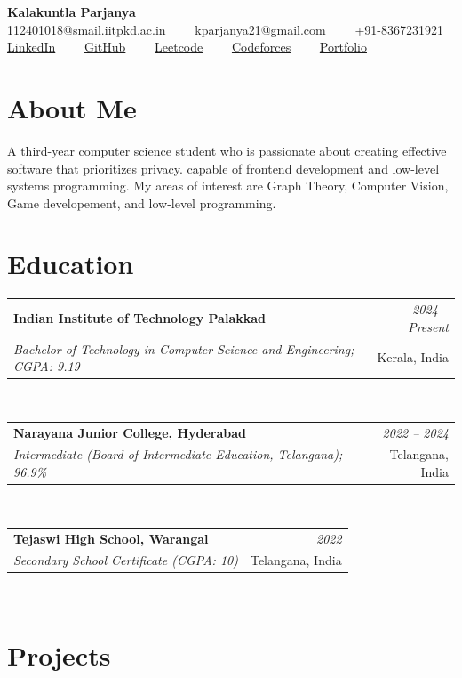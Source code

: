 \documentclass[a4paper,10pt]{article}
\makeatletter
\newcommand{\resumeSubheading}[4]{
\vspace{1.2mm}
    \begin{tabular*}{1.0\textwidth}[t]{l@{\extracolsep{\fill}}r}
        \textbf{#1} & \textit{\small{#4}} \\
        \textit{\small{#3}} &  \small{#2}\\
    \end{tabular*}\\[-1.5mm]
}
\newcommand{\resumeSubHeadingListStart}{}
\newcommand{\resumeSubHeadingListEnd}{\vspace{0.5mm}}
\makeatother
\begin{document}
\selectfont

\begin{center}
    {\Huge \textbf{Kalakuntla Parjanya}} \\[1.5mm]
    \small
    \href{mailto:112401018@smail.iitpkd.ac.in}{112401018@smail.iitpkd.ac.in} \ \ \textbullet\ \ 
    \href{mailto:kparjanya21@gmail.com}{kparjanya21@gmail.com} \ \ \textbullet\ \ 
    \href{tel:+918367231921}{+91-8367231921} \\ \vspace{0.5mm}
    \href{https://www.linkedin.com/in/kparjanya21}{LinkedIn} \ \ \textbullet\ \ 
    \href{https://github.com/kp21-07}{GitHub} \ \ \textbullet\ \ 
    \href{https://leetcode.com/u/kparjanya21}{Leetcode} \ \ \textbullet\ \ 
    \href{https://codeforces.com/profile/kparjanya21}{Codeforces} \ \ \textbullet\ \ 
    \href{https://kp21-07.github.io/}{Portfolio}
\end{center}

\section{\textbf{About Me}}
\begin{justify}
A third-year computer science student who is passionate about creating effective software that prioritizes privacy. capable of frontend development and low-level systems programming. My areas of interest are Graph Theory, Computer Vision, Game developement, and low-level programming.
\end{justify}

\section{\textbf{Education}}
\resumeSubHeadingListStart
  \resumeSubheading
    {Indian Institute of Technology Palakkad}{Kerala, India}
    {Bachelor of Technology in Computer Science and Engineering; CGPA: 9.19}{2024 -- Present}

  \resumeSubheading
    {Narayana Junior College, Hyderabad}{Telangana, India}
    {Intermediate (Board of Intermediate Education, Telangana); 96.9\%}{2022 -- 2024}

  \resumeSubheading
    {Tejaswi High School, Warangal}{Telangana, India}
    {Secondary School Certificate (CGPA: 10)}{2022}
\resumeSubHeadingListEnd

\section{\textbf{Projects}}
\resumeSubHeadingListStart
\end{document}
